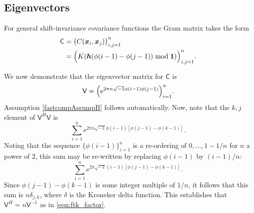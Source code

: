 \documentclass[twocolumn]{svjour3}          %
\newcommand{\bm}[1]{\boldsymbol{#1}}
\newcommand{\vh}{\bm{h}}
\newcommand{\vx}{\bm{x}}
\newcommand{\vone}{\bm{1}}
\newcommand{\mC}{\mathsf{C}}
\newcommand{\mV}{\mathsf{V}}
\newcommand{\me}{\mathrm{e}}
\begin{document}
\subsection{Eigenvectors}
For general shift-invariance covariance functions the Gram matrix takes the form
\begin{align*}
\mC &= \bigl ( C(\vx_i, \vx_j) \bigr)_{i, j = 1}^n \\
& = \Bigl ( K(\vh(\phi(i-1) - \phi(j-1)) \bmod \vone ) \Bigr)_{i, j = 1}^n.
\end{align*}

We now demonstrate that the eigenvector matrix for $\mC$ is 
\begin{equation} \label{latticeVdef}
\mV = \Bigl ( \me^{2 \pi n \sqrt{-1} \phi(i-1)\phi(j-1)} \Bigr)_{i = 1}^n.
\end{equation}
Assumption \eqref{fastcompAssumpB} follows automatically.
Now, note that the $k,j$ element of $\mV^H\mV$ is
\begin{equation*}
\sum_{i=1}^n \me^{2 \pi n \sqrt{-1} \phi(i-1)[\phi(j-1) - \phi(k-1)]}.
\end{equation*}
Noting that the sequence $\{\phi(i-1)\}_{i=1}^n$ is a re-ordering of $0, \ldots, 1-1/n$ for $n$ a power of $2$, this sum may be re-written by replacing $\phi(i-1)$ by $(i-1)/n$:
\begin{equation*}
\sum_{i=1}^n \me^{2 \pi \sqrt{-1} (i-1)[\phi(j-1) - \phi(k-1)]}.
\end{equation*}
Since $\phi(j-1) - \phi(k-1)$ is some integer multiple of $1/n$, it follows that this sum is $n \delta_{j,k}$, where $\delta$ is the Kroneker delta function.  This establishes that $\mV^H = n \mV^{-1}$ as in \eqref{eqn:ftk_factor}.
\end{document}
